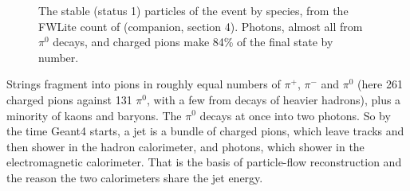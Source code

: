 \begin{figure}[htbp]
\centering
{}
\caption{The stable (status 1) particles of the event by species, from the FWLite count of
 (companion, section 4). Photons, almost all from $\pi^0$
decays, and charged pions make 84\% of the final state by number.}
\label{fig:06_species}
\end{figure}

\begin{plainwords}
Strings fragment into pions in roughly equal numbers of $\pi^+$, $\pi^-$ and $\pi^0$ (here 261 charged pions
against 131 $\pi^0$, with a few from decays of heavier hadrons), plus a minority of kaons and baryons. The $\pi^0$
decays at once into two photons. So by the time Geant4 starts, a jet is a bundle of charged pions, which leave
tracks and then shower in the hadron calorimeter, and photons, which shower in the electromagnetic calorimeter.
That is the basis of particle-flow reconstruction and the reason the two calorimeters share the jet energy.
\end{plainwords}

